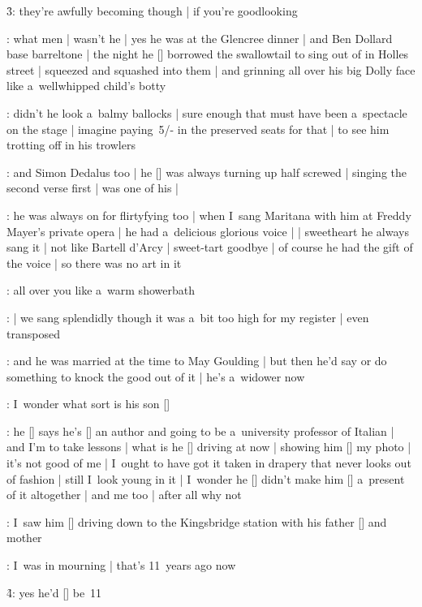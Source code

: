 \f3:
they're awfully becoming though |
if you're goodlooking

:
what men |
wasn't he |
yes he was at the Glencree dinner |
and Ben Dollard base barreltone |
the night he [\dollard] borrowed the swallowtail to sing out of in Holles street |
squeezed and squashed into them |
and grinning all over his big Dolly face like a~wellwhipped child's botty

:
didn't he look a~balmy ballocks |
sure enough that must have been a~spectacle on the stage |
imagine paying~5/- in the preserved seats for that |
to see him trotting off in his trowlers

:
and Simon Dedalus too |
he [\simon] was always turning up half screwed |
singing the second verse first |
 was one of his |

:
he was always on for flirtyfying too |
when I~sang Maritana with him at Freddy Mayer's private opera |
he had a~delicious glorious voice |
 |
sweetheart he always sang it |
not like Bartell d'Arcy |
sweet-tart goodbye |
of course he had the gift of the voice |
so there was no art in it

:
all over you like a~warm showerbath

:
 |
we sang splendidly
though it was a~bit too high for my register |
even transposed

:
and he was married at the time to May Goulding |
but then he'd say or do something to knock the good out of it |
he's a~widower now

:
I~wonder what sort is his son [\stephen]

:
he [\bloom] says he's [\stephen] an author
and going to be a~university professor of Italian |
and I'm to take lessons |
what is he [\bloom] driving at now |
showing him [\stephen] my photo |
it's not good of me |
I~ought to have got it taken in drapery that never looks out of fashion |
still I~look young in it |
I~wonder he [\bloom] didn't make him [\stephen] a~present of it altogether |
and me too |
after all why not

:
I~saw him [\stephen] driving down to the Kingsbridge station
with his father [\simon] and mother

:
I~was in mourning |
that's 11~years ago now

\f4:
yes he'd [\rudy] be~11

